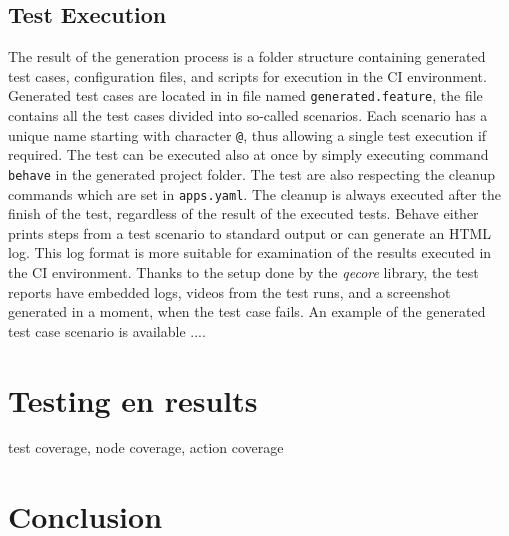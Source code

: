 \section{Test Execution}
The result of the generation process is a folder structure containing generated test cases, configuration files, and scripts for execution in the CI environment. Generated test cases are located in in file named \texttt{generated.feature}, the file contains all the test cases divided into so-called scenarios. Each scenario has a unique name starting with character \texttt{@}, thus allowing a single test execution if required. The test can be executed also at once by simply executing command \texttt{behave} in the generated project folder. The test are also respecting the cleanup commands which are set in \texttt{apps.yaml}. The cleanup is always executed after the finish of the test, regardless of the result of the executed tests. Behave either prints steps from a test scenario to standard output or can generate an HTML log. This log format is more suitable for examination of the results executed in the CI environment. Thanks to the setup done by the \textit{qecore} library, the test reports have embedded logs, videos from the test runs, and a screenshot generated in a moment, when the test case fails. 
An example of the generated test case scenario is available ....



\chapter{Testing en results}
test coverage, node coverage, action coverage




\chapter{Conclusion}
